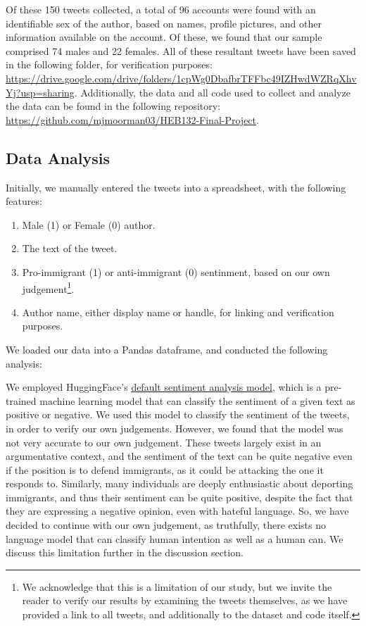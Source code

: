 \documentclass{article}
\begin{document}
Of these 150 tweets collected, a total of 96 accounts were found with an identifiable sex of the author, based on names, profile pictures, and other information available on the account. Of these, we found that our sample comprised 74 males and 22 females. All of these resultant tweets have been saved in the following folder, for verification purposes: \url{https://drive.google.com/drive/folders/1cpWg0DbafbrTFFbc49IZHwdWZRqXhvYj?usp=sharing}. Additionally, the data and all code used to collect and analyze the data can be found in the following repository: \url{https://github.com/mjmoorman03/HEB132-Final-Project}.

\subsection{Data Analysis}
Initially, we manually entered the tweets into a spreadsheet, with the following features:
\begin{enumerate}
    \item Male (1) or Female (0) author.
    \item The text of the tweet.
    \item Pro-immigrant (1) or anti-immigrant (0) sentinment, based on our own judgement\footnote{We acknowledge that this is a limitation of our study, but we invite the reader to verify our results by examining the tweets themselves, as we have provided a link to all tweets, and additionally to the dataset and code itself.}.
    \item Author name, either display name or handle, for linking and verification purposes.
\end{enumerate}

We loaded our data into a Pandas dataframe, and conducted the following analysis:

We employed HuggingFace's \href{https://huggingface.co/distilbert/distilbert-base-uncased-finetuned-sst-2-english?text=the+rainy+day+made+him+feel+quite+down}{default sentiment analysis model}, which is a pre-trained machine learning model that can classify the sentiment of a given text as positive or negative. We used this model to classify the sentiment of the tweets, in order to verify our own judgements. However, we found that the model was not very accurate to our own judgement. These tweets largely exist in an argumentative context, and the sentiment of the text can be quite negative even if the position is to defend immigrants, as it could be attacking the one it responds to. Similarly, many individuals are deeply enthusiastic about deporting immigrants, and thus their sentiment can be quite positive, despite the fact that they are expressing a negative opinion, even with hateful language. So, we have decided to continue with our own judgement, as truthfully, there exists no language model that can classify human intention as well as a human can. We discuss this limitation further in the discussion section.
\end{document}
